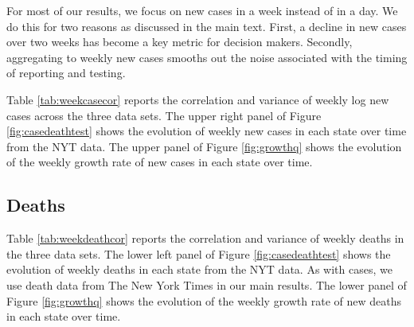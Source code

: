 \documentclass[11pt,reqno,letter]{amsart}
\theoremstyle{definition}
\begin{document}



For most of our results, we focus on new cases in a week instead of in
a day. We do this for two reasons as discussed in the main text. First, a decline in new cases over
two weeks has become a key metric for decision makers. Secondly, aggregating to weekly new cases smooths out the noise associated with  the timing of
reporting and testing.

Table \ref{tab:weekcasecor} reports the correlation and variance of
weekly log new cases across the three data sets. The upper right panel of Figure
\ref{fig:casedeathtest} shows the evolution of weekly new cases in each
state over time  from the NYT data. The upper panel of Figure \ref{fig:growthq} shows the evolution of the weekly growth rate of new cases in each
state over time.




\subsection{Deaths}

Table \ref{tab:weekdeathcor} reports the correlation and variance of
weekly deaths in the three data sets. The lower left panel of Figure \ref{fig:casedeathtest}
shows the evolution of weekly deaths in each state from the NYT data. As with cases, we
use death data from The New York Times in our main results. The lower panel of Figure \ref{fig:growthq} shows the evolution of the weekly growth rate of new deaths in each
state over time.
\end{document}
